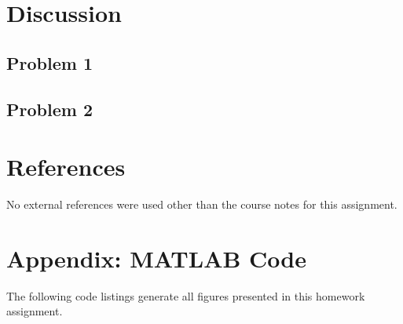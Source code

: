 \documentclass[11pt]{article}
\begin{document}
\section{Discussion} %

\subsection{Problem 1}

\subsection{Problem 2}

\section{References} %

No external references were used other than the course notes for this assignment.

\section*{Appendix: MATLAB Code} %

The following code listings generate all figures presented in this homework assignment. 


\end{document}
